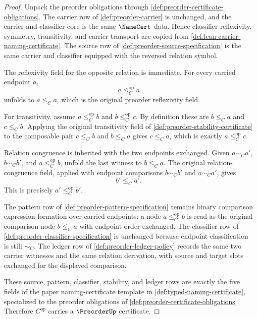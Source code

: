 \begin{proof}
Unpack the preorder obligations through \autoref{def:preorder-certificate-obligations}. The carrier row of \autoref{def:preorder-carrier} is unchanged, and the carrier-and-classifier core is the same $\NameCert$ data. Hence classifier reflexivity, symmetry, transitivity, and carrier transport are copied from \autoref{def:lean-carrier-naming-certificate}. The source row of \autoref{def:preorder-source-specification} is the same carrier and classifier equipped with the reversed relation symbol.

The reflexivity field for the opposite relation is immediate. For every carried endpoint $a$,
$$
a\le_C^{\mathrm{op}}a
$$
unfolds to $a\le_C a$, which is the original preorder reflexivity field.

For transitivity, assume $a\le_C^{\mathrm{op}} b$ and $b\le_C^{\mathrm{op}} c$. By definition these are $b\le_C a$ and $c\le_C b$. Applying the original transitivity field of \autoref{def:preorder-stability-certificate} to the composable pair $c\le_C b$ and $b\le_C a$ gives $c\le_C a$, which is exactly $a\le_C^{\mathrm{op}} c$.

Relation congruence is inherited with the two endpoints exchanged. Given $a\sim_C a'$, $b\sim_C b'$, and $a\le_C^{\mathrm{op}}b$, unfold the last witness to $b\le_C a$. The original relation-congruence field, applied with endpoint comparisons $b\sim_C b'$ and $a\sim_C a'$, gives
$$
b'\le_C a'.
$$
This is precisely $a'\le_C^{\mathrm{op}} b'$.

The pattern row of \autoref{def:preorder-pattern-specification} remains binary comparison expression formation over carried endpoints: a node $a\le_C^{\mathrm{op}}b$ is read as the original comparison node $b\le_C a$ with endpoint order exchanged. The classifier row of \autoref{def:preorder-classifier-specification} is unchanged because endpoint classification is still $\sim_C$. The ledger row of \autoref{def:preorder-ledger-policy} records the same two carrier witnesses and the same relation derivation, with source and target slots exchanged for the displayed comparison.

These source, pattern, classifier, stability, and ledger rows are exactly the five fields of the paper naming-certificate template in \autoref{def:typed-naming-certificate}, specialized to the preorder obligations of \autoref{def:preorder-certificate-obligations}. Therefore $C^{\mathrm{op}}$ carries a $\PreorderUp$ certificate.
\end{proof}

